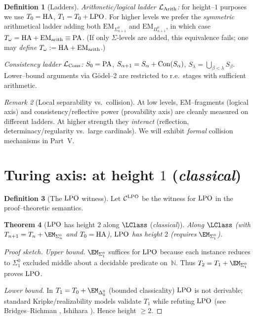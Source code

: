 \documentclass[11pt]{article}
\newtheorem{theorem}{Theorem}[section]
\theoremstyle{definition}
\newtheorem{definition}[theorem]{Definition}
\theoremstyle{remark}
\newtheorem{remark}[theorem]{Remark}
\newcommand{\N}{\mathbb{N}}
\begin{document}
\begin{definition}[Ladders]\label{III:def:ladders-new}
\emph{Arithmetic/logical ladder \(\mathcal{L}_{\mathrm{Arith}}\):}
for height--\(1\) purposes we use \(T_0=\mathrm{HA}\), \(T_1=T_0+\mathrm{LPO}\).
For higher levels we prefer the \emph{symmetric} arithmetical ladder
adding both \(\mathrm{EM}_{\Sigma^0_{n+1}}\) and \(\mathrm{EM}_{\Pi^0_{n+1}}\), in which case
\(T_\omega=\mathrm{HA}+\mathrm{EM}_{\mathrm{arith}}\equiv \mathrm{PA}\). (If only \(\Sigma\)-levels are added, this
equivalence fails; one may \emph{define} \(T_\omega:=\mathrm{HA}+\mathrm{EM}_{\mathrm{arith}}\).)

\emph{Consistency ladder \(\mathcal{L}_{\mathrm{Cons}}\):}
\(S_0=\mathrm{PA}\), \(S_{\alpha+1}=S_\alpha+\mathrm{Con}(S_\alpha)\), \(S_\lambda=\bigcup_{\beta<\lambda}S_\beta\).
Lower--bound arguments via G\"odel--2 are restricted to r.e.\ stages with sufficient arithmetic.
\end{definition}

\begin{remark}[Local separability vs.\ collision]
At low levels, EM--fragments (logical axis) and consistency/reflective power (provability axis)
are cleanly measured on different ladders. At higher strength they \emph{interact} (reflection,
determinacy/regularity vs.\ large cardinals). We will exhibit \emph{formal} collision mechanisms
in Part~V.
\end{remark}

\section{Turing axis: \texorpdfstring{\LPO}{LPO} at height \(1\) (\emph{classical})}

\begin{definition}[The \(\mathrm{LPO}\) witness]
Let \(\mathcal C^{\mathrm{LPO}}\) be the witness for \(\mathrm{LPO}\) in the proof--theoretic semantics.
\end{definition}

\begin{theorem}[\(\mathrm{LPO}\) has height \(2\) along \(\LClass\) (\emph{classical})]\label{III:thm:LPO-height1-new}
Along \(\LClass\) (with \(T_{n+1}=T_n+\EM_{\Sigma^0_n}\) and \(T_0=\mathrm{HA}\)), \(\mathrm{LPO}\) has height \(2\) (requires \(\EM_{\Sigma^0_1}\)).
\end{theorem}

\begin{proof}[Proof sketch]
\emph{Upper bound.} \(\EM_{\Sigma^0_1}\) suffices for \(\mathrm{LPO}\) because each instance
reduces to \(\Sigma^0_1\) excluded middle about a decidable predicate on~\(\N\). 
Thus \(T_2=T_1+\EM_{\Sigma^0_1}\) proves \(\mathrm{LPO}\). 

\emph{Lower bound.} In \(T_1=T_0+\EM_{\Delta^0_0}\) (bounded classicality) \(\mathrm{LPO}\) 
is not derivable; standard Kripke/realizability models validate \(T_1\) while refuting \(\mathrm{LPO}\)
(see Bridges--Richman \cite{BridgesRichman}, Ishihara \cite{Ishihara06}). Hence height \(\ge 2\).
\end{proof}
\end{document}
